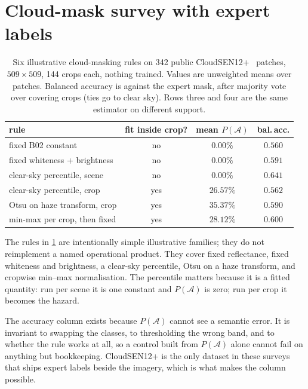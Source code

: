 \documentclass[10pt,twocolumn,letterpaper]{article}
\newcommand{\A}{\mathcal{A}}
\begin{document}
\section{Cloud-mask survey with expert labels}

\begin{table}[tb]
\centering
\scriptsize
\setlength{\tabcolsep}{1.4pt}
\begin{tabular}{lccc}
\toprule
rule & fit inside crop? & mean $P(\A)$ & bal.\,acc. \\
\midrule
fixed B02 constant            & no  & $0.00\%$  & $0.560$ \\
fixed whiteness + brightness  & no  & $0.00\%$  & $0.591$ \\
clear-sky percentile, scene   & no  & $0.00\%$  & $0.641$ \\
clear-sky percentile, crop    & yes & $26.57\%$ & $0.562$ \\
Otsu on haze transform, crop  & yes & $35.37\%$ & $0.590$ \\
min-max per crop, then fixed  & yes & $28.12\%$ & $0.600$ \\
\bottomrule
\end{tabular}
\caption{Six illustrative cloud-masking rules on 342 public CloudSEN12+~\cite{aybar2024cloudsen12plus} patches,
$509 \times 509$, 144 crops each, nothing trained. Values are unweighted means over
patches. Balanced accuracy is against the expert mask, after majority vote over
covering crops (ties go to clear sky). Rows three and four are the same estimator on
different support.}
\label{tab:cloud}
\end{table}

The rules in \cref{tab:cloud} are intentionally simple illustrative families; they
do not reimplement a named operational product. They cover fixed reflectance, fixed
whiteness and brightness, a clear-sky percentile, Otsu on a haze transform, and cropwise
min--max normalisation. The percentile matters because it is a fitted quantity: run
per scene it is one constant and $P(\A)$ is zero; run per crop it becomes the hazard.

The accuracy column exists because $P(\A)$ cannot see a semantic error. It is
invariant to swapping the classes, to thresholding the wrong band, and to whether the
rule works at all, so a control built from $P(\A)$ alone cannot fail on anything but
bookkeeping. CloudSEN12+ is the only dataset in these surveys that ships expert labels
beside the imagery, which is what makes the column possible.
\end{document}

